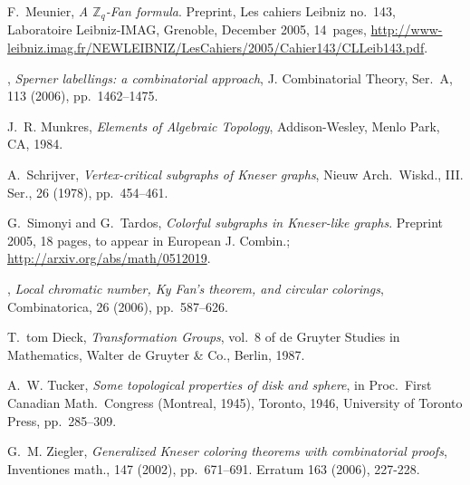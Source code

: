 \documentclass[11pt,a4paper,draft]{article}
\theoremstyle{definition}
\begin{document}
\begin{small}
\begin{thebibliography}{10}
{\sc F.~Meunier}, {\em A {${\mathbb Z}_q$}-{F}an formula}.
\newblock Preprint, Les cahiers Leibniz no.~143, Laboratoire Leibniz-IMAG,
  Grenoble, December 2005, 14~pages, {\scriptsize
  \url{http://www-leibniz.imag.fr/NEWLEIBNIZ/LesCahiers/2005/Cahier143/CLLeib143.pdf}}.

\leavevmode\vrule height 2pt depth -1.6pt width 23pt, {\em Sperner labellings:
  a combinatorial approach}, J. Combinatorial Theory, Ser.~A, 113 (2006),
  pp.~1462--1475.

{\sc J.~R. Munkres}, {\em Elements of Algebraic Topology}, Addison-Wesley,
  Menlo Park, CA, 1984.

{\sc A.~Schrijver}, {\em Vertex-critical subgraphs of {K}neser graphs}, Nieuw
  Arch.\ Wiskd., III. Ser., 26 (1978), pp.~454--461.

{\sc G.~Simonyi and G.~Tardos}, {\em Colorful subgraphs in {K}neser-like
  graphs}.
\newblock Preprint 2005, 18 pages, to appear in European J. Combin.;
  \url{http://arxiv.org/abs/math/0512019}.

\leavevmode\vrule height 2pt depth -1.6pt width 23pt, {\em Local chromatic
  number, {Ky Fan}'s theorem, and circular colorings}, Combinatorica, 26
  (2006), pp.~587--626.

{\sc T.~tom Dieck}, {\em Transformation Groups}, vol.~8 of de Gruyter Studies
  in Mathematics, Walter de Gruyter \& Co., Berlin, 1987.

{\sc A.~W. Tucker}, {\em Some topological properties of disk and sphere}, in
  Proc.\ First Canadian Math.\ Congress (Montreal, 1945), Toronto, 1946,
  University of Toronto Press, pp.~285--309.

{\sc G.~M. Ziegler}, {\em Generalized {K}neser coloring theorems with
  combinatorial proofs}, Inventiones math., 147 (2002), pp.~671--691.
\newblock Erratum 163 (2006), 227-228.

\end{thebibliography}
\end{small}
\end{document}
